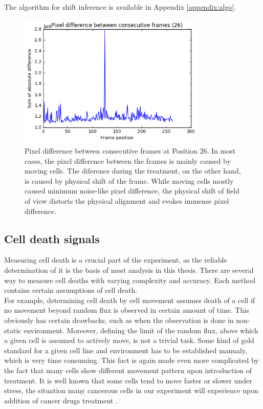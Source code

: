 \documentclass[pdftex,12pt,a4paper]{report}
\begin{document}
The algorithm for shift inference is available in Appendix \ref{appendix:algo}.

\begin{figure}[H]
\centering
\includegraphics[width=0.8\textwidth]{images/pixdiff}
\caption{Pixel difference between consecutive frames at Position 26. In most cases, the pixel difference between the frames is mainly caused by moving cells. The diference during the treatment, on the other hand, is caused by physical shift of the frame. While moving cells mostly caused minimum noise-like pixel difference, the physical shift of field of view distorts the physical alignment and evokes immense pixel difference.}
\label{fig:pixdiff}
\end{figure}

\subsection{Cell death signals}

Measuring cell death is a crucial part of the experiment, as the reliable determination of it is the basis of most analysis in this thesis. There are several way to measure cell deaths with varying complexity and accuracy. Each method contains certain assumptions of cell death.\\

For example, determining cell death by cell movement assumes death of a cell if no movement beyond random flux is observed in certain amount of time. This obviously has certain drawbacks, such as when the observation is done in non-static environment. Moreover, defining the limit of the random flux, above which a given cell is assumed to actively move, is not a trivial task. Some kind of gold standard for a given cell line and environment has to be established manualy, which is very time consuming. This fact is again made even more complicated by the fact that many cells show different movement pattern upon introduction of treatment. It is well known that some cells tend to move faster or slower under stress, the situation many cancerous cells in our experiment will experience upon addition of cancer drugs treatment \cite{pienta1991effects, fenteany2003small, ruocco2012suppressing}.\\
\end{document}
